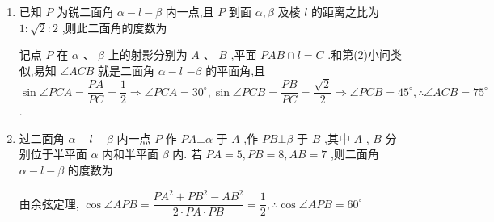 \begin{enumerate}
\begin{enumerate}
\begin{jieda}
            $\therefore \angle {PCA} = {30}^{ \circ  }$ ,同理 $\angle {PCB} = {30}^{ \circ  },\therefore \angle {ACB} = {60}^{ \circ  }$ .
        \end{jieda}
        \item 已知 $P$ 为锐二面角 $\alpha  - l - \beta$ 内一点,且 $P$ 到面 $\alpha ,\beta$ 及棱 $l$ 的距离之比为 $1 : \sqrt{2} : 2$ ,则此二面角的度数为
        \begin{jieda}
            记点 $P$ 在 $\alpha$ 、 $\beta$ 上的射影分别为 $A$ 、 $B$ ,平面 ${PAB} \cap  l = C$ .和第(2)小问类似,易知 $\angle {ACB}$ 就是二面角 $\alpha  - l$  $- \beta$ 的平面角,且 $\sin \angle {PCA} = \dfrac{PA}{PC} = \dfrac{1}{2} \Longrightarrow  \angle {PCA} = {30}^{ \circ  },\sin \angle {PCB} = \dfrac{PB}{PC} = \dfrac{\sqrt{2}}{2} \Longrightarrow  \angle {PCB} = {45}^{ \circ  },\therefore \angle {ACB} = {75}^{ \circ  }$ .
        \end{jieda}
        \item 过二面角 $\alpha  - l - \beta$ 内一点 $P$ 作 ${PA}\bot \alpha$ 于 $A$ ,作 ${PB}\bot \beta$ 于 $B$ ,其中 $A$ , $B$ 分别位于半平面 $\alpha$ 内和半平面 $\beta$ 内. 若 ${PA} = 5,{PB} = 8,{AB} = 7$ ,则二面角 $\alpha  - l - \beta$ 的度数为
        \begin{jieda}
            由余弦定理, $\cos \angle {APB} = \dfrac{P{A}^{2} + P{B}^{2} - A{B}^{2}}{2 \cdot  {PA} \cdot  {PB}} = \dfrac{1}{2},\therefore \cos \angle {APB} = {60}^{ \circ  }$ 
            

\end{jieda}
\end{enumerate}
\end{enumerate}
